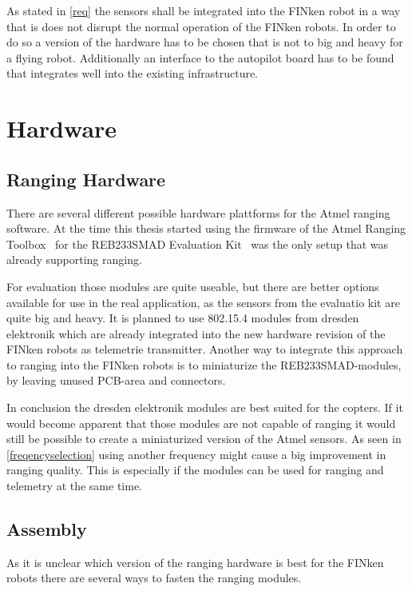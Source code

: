 
As stated in \autoref{req} the sensors shall be integrated into the FINken robot in a way that is does not disrupt the normal operation of the FINken robots.
In order to do so a version of the hardware has to be chosen that is not to big and heavy for a flying robot.
Additionally an interface to the autopilot board has to be found that integrates well into the existing infrastructure.

\section{Hardware}

\subsection{Ranging Hardware}

There are several different possible hardware plattforms for the Atmel ranging software.
At the time this thesis started using the firmware of the Atmel Ranging Toolbox~\cite{atmelrtb} for the REB233SMAD Evaluation Kit~\cite{REB233SMAD} was the only setup that was already supporting ranging.

For evaluation those modules are quite useable, but there are better options available for use in the real application, as the sensors from the evaluatio kit are quite big and heavy.
It is planned to use 802.15.4 modules from dresden elektronik which are already integrated into the new hardware revision of the FINken robots as telemetrie transmitter.
Another way to integrate this approach to ranging into the FINken robots is to miniaturize the REB233SMAD-modules, by leaving unused PCB-area and connectors.

In conclusion the dresden elektronik modules are best suited for the copters.
If it would become apparent that those modules are not capable of ranging it would still be possible to create a miniaturized version of the Atmel sensors.
As seen in \autoref{freqencyselection} using another frequency might cause a big improvement in ranging quality.
This is especially if the modules can be used for ranging and telemetry at the same time.

\subsection{Assembly}

As it is unclear which version of the ranging hardware is best for the FINken robots there are several ways to fasten the ranging modules.

